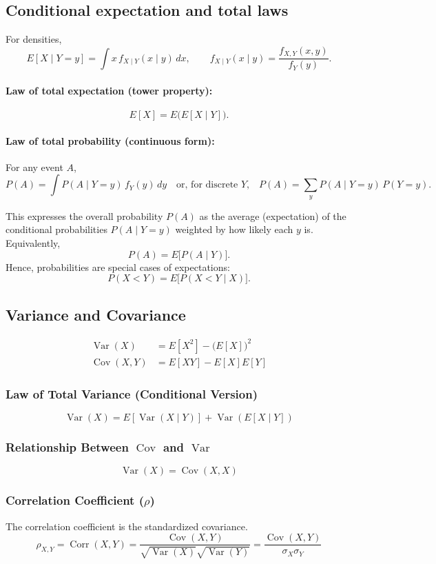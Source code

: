 \documentclass[12pt]{article}
\begin{document}
\subsection{Conditional expectation and total laws}
For densities,
\[
E[X\mid Y=y]=\int x\,f_{X\mid Y}(x\mid y)\,dx,
\qquad
f_{X\mid Y}(x\mid y)=\frac{f_{X,Y}(x,y)}{f_Y(y)}.
\]

\paragraph{Law of total expectation (tower property):}
\[
E[X]=E\big(E[X\mid Y]\big).
\]

\paragraph{Law of total probability (continuous form):}
For any event $A$,
\[
P(A)=\int P(A\mid Y=y)\,f_Y(y)\,dy
\quad\text{or, for discrete $Y$,}\quad
P(A)=\sum_y P(A\mid Y=y)\,P(Y=y).
\]

This expresses the overall probability $P(A)$ as the average (expectation) of the conditional probabilities $P(A\mid Y=y)$ weighted by how likely each $y$ is.  
Equivalently,
\[
P(A)=E\big[P(A\mid Y)\big].
\]
Hence, probabilities are special cases of expectations:
\[
P(X<Y)=E\big[P(X<Y\mid X)\big].
\]

\subsection{Variance and Covariance}
\begin{align*}
\operatorname{Var}(X) &= E[X^2]-\big(E[X]\big)^2 \\
\operatorname{Cov}(X,Y) &= E[XY]-E[X]E[Y]
\end{align*}

\subsubsection{Law of Total Variance (Conditional Version)}
\[
\operatorname{Var}(X)=E[\operatorname{Var}(X\mid Y)] + \operatorname{Var}(E[X\mid Y])
\]

\subsubsection{Relationship Between $\operatorname{Cov}$ and $\operatorname{Var}$}
\[
\operatorname{Var}(X) = \operatorname{Cov}(X, X)
\]

\subsubsection{Correlation Coefficient ($\rho$)}
The correlation coefficient is the standardized covariance.
\[
\rho_{X,Y} = \operatorname{Corr}(X,Y) = \frac{\operatorname{Cov}(X,Y)}{\sqrt{\operatorname{Var}(X)}\sqrt{\operatorname{Var}(Y)}} = \frac{\operatorname{Cov}(X,Y)}{\sigma_X \sigma_Y}
\]
\end{document}
